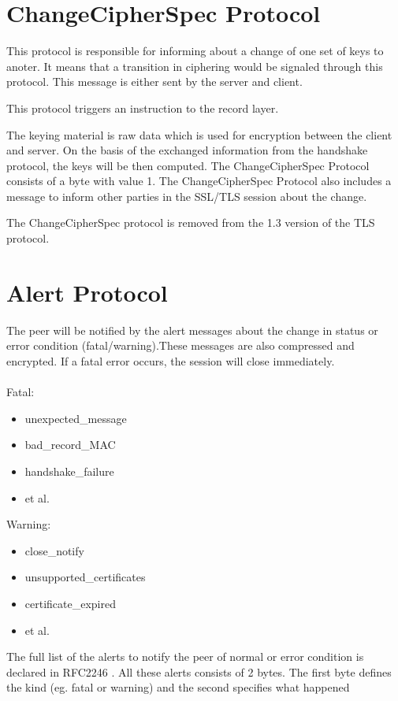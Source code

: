 \section{ChangeCipherSpec Protocol}
\label{sec:changeciphfer_protocol}
This protocol is responsible for informing about a change of one set of keys to anoter. It means that a transition in ciphering would be signaled through this protocol. This message is either sent by the server and client. 

This protocol triggers an instruction to the record layer.

The keying material is raw data which is used for encryption between the client and server. On the basis of the exchanged information from the handshake protocol, the keys will be then computed.
The ChangeCipherSpec Protocol consists of a byte with value 1.
The ChangeCipherSpec Protocol also includes a message to inform other parties in the SSL/TLS session about the change.   \cite{ms:overview}

The ChangeCipherSpec protocol is removed from the 1.3 version of the TLS protocol.

\section{Alert Protocol}
\label{sec:alert_protocol}
The peer will be notified by the alert messages about the change in status or error condition (fatal/warning).These messages are also compressed and encrypted. If a fatal error occurs, the session will close immediately.\\\\ 
Fatal:
\begin{itemize}
	\item unexpected\_message
	 \item bad\_record\_MAC
	 \item handshake\_failure 
	 \item et al.
\end{itemize}
	
Warning:
\begin{itemize}
\item close\_notify
\item unsupported\_certificates
\item certificate\_expired
\item et al.

\end{itemize}

The full list of the alerts to notify the peer of normal or error condition is declared in RFC2246 \cite{rfc2246}. All these alerts consists of 2 bytes. The first byte defines the kind (eg. fatal or warning) and the second specifies what happened \cite{W.Stalling} \cite{ms:overview}

